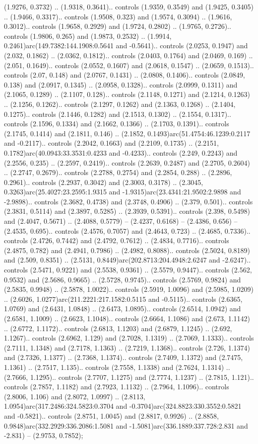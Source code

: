 (1.9276, 0.3732) .. (1.9318, 0.3641).. controls (1.9359, 0.3549) and (1.9425, 0.3405) .. (1.9466, 0.3317).. controls (1.9508, 0.323) and (1.9574, 0.3094) .. (1.9616, 0.3012).. controls (1.9658, 0.2929) and (1.9724, 0.2802) .. (1.9765, 0.2726).. controls (1.9806, 0.265) and (1.9873, 0.2532) .. (1.9914, 0.2461)arc(149.7382:144.1908:0.5641 and -0.5641).. controls (2.0253, 0.1947) and (2.032, 0.1862) .. (2.0362, 0.1812).. controls (2.0403, 0.1764) and (2.0469, 0.169) .. (2.051, 0.1649).. controls (2.0552, 0.1607) and (2.0618, 0.1547) .. (2.0659, 0.1513).. controls (2.07, 0.148) and (2.0767, 0.1431) .. (2.0808, 0.1406).. controls (2.0849, 0.138) and (2.0917, 0.1345) .. (2.0958, 0.1328).. controls (2.0999, 0.1311) and (2.1065, 0.1289) .. (2.1107, 0.128).. controls (2.1148, 0.1271) and (2.1214, 0.1263) .. (2.1256, 0.1262).. controls (2.1297, 0.1262) and (2.1363, 0.1268) .. (2.1404, 0.1275).. controls (2.1446, 0.1282) and (2.1513, 0.1302) .. (2.1554, 0.1317).. controls (2.1596, 0.1334) and (2.1662, 0.1366) .. (2.1703, 0.1391).. controls (2.1745, 0.1414) and (2.1811, 0.146) .. (2.1852, 0.1493)arc(51.4754:46.1239:0.2117 and -0.2117).. controls (2.2042, 0.1663) and (2.2109, 0.1735) .. (2.2151, 0.1782)arc(40.0943:33.3531:0.4233 and -0.4233).. controls (2.249, 0.2243) and (2.2556, 0.235) .. (2.2597, 0.2419).. controls (2.2639, 0.2487) and (2.2705, 0.2604) .. (2.2747, 0.2679).. controls (2.2788, 0.2754) and (2.2854, 0.288) .. (2.2896, 0.2961).. controls (2.2937, 0.3042) and (2.3003, 0.3178) .. (2.3045, 0.3263)arc(25.4027:23.2595:1.9315 and -1.9315)arc(23.4341:21.9502:2.9898 and -2.9898).. controls (2.3682, 0.4738) and (2.3748, 0.4906) .. (2.379, 0.501).. controls (2.3831, 0.5114) and (2.3897, 0.5285) .. (2.3939, 0.5391).. controls (2.398, 0.5498) and (2.4047, 0.5671) .. (2.4088, 0.5779) -- (2.4237, 0.6168) -- (2.4386, 0.656) -- (2.4535, 0.695).. controls (2.4576, 0.7057) and (2.4643, 0.723) .. (2.4685, 0.7336).. controls (2.4726, 0.7442) and (2.4792, 0.7612) .. (2.4834, 0.7716).. controls (2.4875, 0.782) and (2.4941, 0.7986) .. (2.4982, 0.8088).. controls (2.5024, 0.8189) and (2.509, 0.8351) .. (2.5131, 0.8449)arc(202.8713:204.4948:2.6247 and -2.6247).. controls (2.5471, 0.9221) and (2.5538, 0.9361) .. (2.5579, 0.9447).. controls (2.562, 0.9532) and (2.5686, 0.9665) .. (2.5728, 0.9745).. controls (2.5769, 0.9824) and (2.5835, 0.9948) .. (2.5878, 1.0022).. controls (2.5919, 1.0096) and (2.5985, 1.0209) .. (2.6026, 1.0277)arc(211.2221:217.1582:0.5115 and -0.5115).. controls (2.6365, 1.0769) and (2.6431, 1.0848) .. (2.6473, 1.0895).. controls (2.6514, 1.0942) and (2.6581, 1.1009) .. (2.6623, 1.1048).. controls (2.6664, 1.1086) and (2.673, 1.1142) .. (2.6772, 1.1172).. controls (2.6813, 1.1203) and (2.6879, 1.1245) .. (2.692, 1.1267).. controls (2.6962, 1.129) and (2.7028, 1.1319) .. (2.7069, 1.1333).. controls (2.7111, 1.1348) and (2.7178, 1.1363) .. (2.7219, 1.1368).. controls (2.726, 1.1374) and (2.7326, 1.1377) .. (2.7368, 1.1374).. controls (2.7409, 1.1372) and (2.7475, 1.1361) .. (2.7517, 1.135).. controls (2.7558, 1.1338) and (2.7624, 1.1314) .. (2.7666, 1.1295).. controls (2.7707, 1.1275) and (2.7774, 1.1237) .. (2.7815, 1.121).. controls (2.7857, 1.1182) and (2.7923, 1.1132) .. (2.7964, 1.1096).. controls (2.8006, 1.106) and (2.8072, 1.0997) .. (2.8113, 1.0954)arc(317.2486:324.5823:0.3704 and -0.3704)arc(324.8823:330.3552:0.5821 and -0.5821).. controls (2.8751, 1.0045) and (2.8817, 0.9926) .. (2.8858, 0.9848)arc(332.2929:336.2086:1.5081 and -1.5081)arc(336.1889:337.728:2.831 and -2.831) -- (2.9753, 0.7852);



